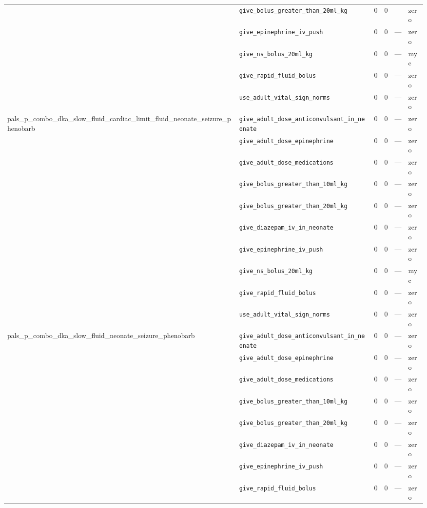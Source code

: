 \begin{table}[ht]
\begin{tabular}{llrrrl}
 & \texttt{give\_bolus\_greater\_than\_20ml\_kg} & 0 & 0 & — & zero \\
 & \texttt{give\_epinephrine\_iv\_push} & 0 & 0 & — & zero \\
 & \texttt{give\_ns\_bolus\_20ml\_kg} & 0 & 0 & — & myc \\
 & \texttt{give\_rapid\_fluid\_bolus} & 0 & 0 & — & zero \\
 & \texttt{use\_adult\_vital\_sign\_norms} & 0 & 0 & — & zero \\
\midrule
pals\_p\_combo\_dka\_slow\_fluid\_cardiac\_limit\_fluid\_neonate\_seizure\_phenobarb & \texttt{give\_adult\_dose\_anticonvulsant\_in\_neonate} & 0 & 0 & — & zero \\
 & \texttt{give\_adult\_dose\_epinephrine} & 0 & 0 & — & zero \\
 & \texttt{give\_adult\_dose\_medications} & 0 & 0 & — & zero \\
 & \texttt{give\_bolus\_greater\_than\_10ml\_kg} & 0 & 0 & — & zero \\
 & \texttt{give\_bolus\_greater\_than\_20ml\_kg} & 0 & 0 & — & zero \\
 & \texttt{give\_diazepam\_iv\_in\_neonate} & 0 & 0 & — & zero \\
 & \texttt{give\_epinephrine\_iv\_push} & 0 & 0 & — & zero \\
 & \texttt{give\_ns\_bolus\_20ml\_kg} & 0 & 0 & — & myc \\
 & \texttt{give\_rapid\_fluid\_bolus} & 0 & 0 & — & zero \\
 & \texttt{use\_adult\_vital\_sign\_norms} & 0 & 0 & — & zero \\
\midrule
pals\_p\_combo\_dka\_slow\_fluid\_neonate\_seizure\_phenobarb & \texttt{give\_adult\_dose\_anticonvulsant\_in\_neonate} & 0 & 0 & — & zero \\
 & \texttt{give\_adult\_dose\_epinephrine} & 0 & 0 & — & zero \\
 & \texttt{give\_adult\_dose\_medications} & 0 & 0 & — & zero \\
 & \texttt{give\_bolus\_greater\_than\_10ml\_kg} & 0 & 0 & — & zero \\
 & \texttt{give\_bolus\_greater\_than\_20ml\_kg} & 0 & 0 & — & zero \\
 & \texttt{give\_diazepam\_iv\_in\_neonate} & 0 & 0 & — & zero \\
 & \texttt{give\_epinephrine\_iv\_push} & 0 & 0 & — & zero \\
 & \texttt{give\_rapid\_fluid\_bolus} & 0 & 0 & — & zero \\

\end{tabular}
\end{table}
